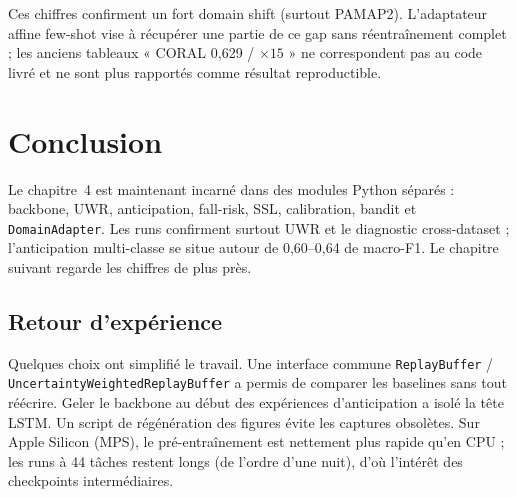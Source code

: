 Ces chiffres confirment un fort domain shift (surtout PAMAP2). L'adaptateur
affine few-shot vise à récupérer une partie de ce gap sans réentraînement
complet ; les anciens tableaux « CORAL 0,629 / $\times 15$ » ne correspondent
pas au code livré et ne sont plus rapportés comme résultat reproductible.

\section{Conclusion}

Le chapitre~4 est maintenant incarné dans des modules Python séparés : backbone,
UWR, anticipation, fall-risk, SSL, calibration, bandit et
\texttt{DomainAdapter}. Les runs confirment surtout UWR et le diagnostic
cross-dataset ; l'anticipation multi-classe se situe autour de 0,60--0,64 de
macro-F1. Le chapitre suivant regarde les chiffres de plus près.

\subsection{Retour d'expérience}

Quelques choix ont simplifié le travail. Une interface commune
\texttt{ReplayBuffer} / \texttt{UncertaintyWeightedReplayBuffer} a permis de
comparer les baselines sans tout réécrire. Geler le backbone au début des
expériences d'anticipation a isolé la tête LSTM. Un script de régénération
des figures évite les captures obsolètes. Sur Apple Silicon (MPS), le
pré-entraînement est nettement plus rapide qu'en CPU ; les runs à 44 tâches
restent longs (de l'ordre d'une nuit), d'où l'intérêt des checkpoints
intermédiaires.
